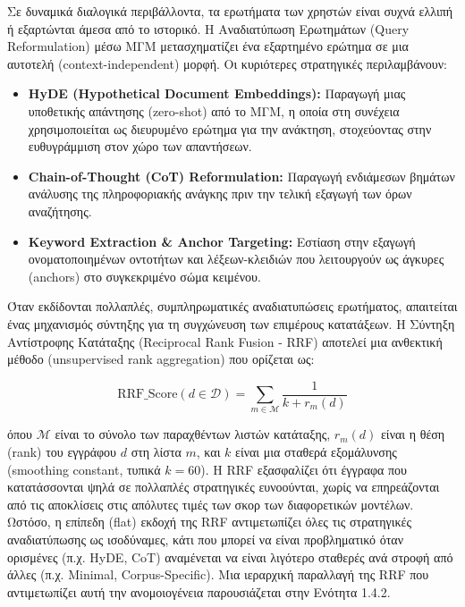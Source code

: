 Σε δυναμικά διαλογικά περιβάλλοντα, τα ερωτήματα των χρηστών είναι συχνά ελλιπή ή εξαρτώνται άμεσα από το ιστορικό. Η Αναδιατύπωση Ερωτημάτων (Query Reformulation) μέσω ΜΓΜ μετασχηματίζει ένα εξαρτημένο ερώτημα σε μια αυτοτελή (context-independent) μορφή. Οι κυριότερες στρατηγικές περιλαμβάνουν:
\begin{itemize}
    \item \textbf{HyDE (Hypothetical Document Embeddings):} Παραγωγή μιας υποθετικής απάντησης (zero-shot) από το ΜΓΜ, η οποία στη συνέχεια χρησιμοποιείται ως διευρυμένο ερώτημα για την ανάκτηση, στοχεύοντας στην ευθυγράμμιση στον χώρο των απαντήσεων.
    \item \textbf{Chain-of-Thought (CoT) Reformulation:} Παραγωγή ενδιάμεσων βημάτων ανάλυσης της πληροφοριακής ανάγκης πριν την τελική εξαγωγή των όρων αναζήτησης.
    \item \textbf{Keyword Extraction \& Anchor Targeting:} Εστίαση στην εξαγωγή ονοματοποιημένων οντοτήτων και λέξεων-κλειδιών που λειτουργούν ως άγκυρες (anchors) στο συγκεκριμένο σώμα κειμένου.
\end{itemize}

Όταν εκδίδονται πολλαπλές, συμπληρωματικές αναδιατυπώσεις ερωτήματος, απαιτείται ένας μηχανισμός σύντηξης για τη συγχώνευση των επιμέρους κατατάξεων. Η Σύντηξη Αντίστροφης Κατάταξης (Reciprocal Rank Fusion - RRF) αποτελεί μια ανθεκτική μέθοδο (unsupervised rank aggregation) που ορίζεται ως:

\begin{equation}
\text{RRF\_Score}(d \in \mathcal{D}) = \sum_{m \in \mathcal{M}} \frac{1}{k + r_m(d)}
\end{equation}

όπου $\mathcal{M}$ είναι το σύνολο των παραχθέντων λιστών κατάταξης, $r_m(d)$ είναι η θέση (rank) του εγγράφου $d$ στη λίστα $m$, και $k$ είναι μια σταθερά εξομάλυνσης (smoothing constant, τυπικά $k=60$). Η RRF εξασφαλίζει ότι έγγραφα που κατατάσσονται ψηλά σε πολλαπλές στρατηγικές ευνοούνται, χωρίς να επηρεάζονται από τις αποκλίσεις στις απόλυτες τιμές των σκορ των διαφορετικών μοντέλων. Ωστόσο, η επίπεδη (flat) εκδοχή της RRF αντιμετωπίζει όλες τις στρατηγικές αναδιατύπωσης ως ισοδύναμες, κάτι που μπορεί να είναι προβληματικό όταν ορισμένες (π.χ. HyDE, CoT) αναμένεται να είναι λιγότερο σταθερές ανά στροφή από άλλες (π.χ. Minimal, Corpus-Specific). Μια ιεραρχική παραλλαγή της RRF που αντιμετωπίζει αυτή την ανομοιογένεια παρουσιάζεται στην Ενότητα 1.4.2.

